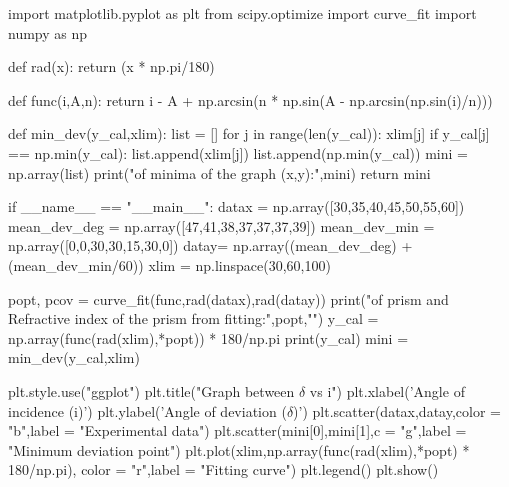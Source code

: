 \documentclass{article}
\begin{document}
\begin{pycode}


import matplotlib.pyplot as plt
from scipy.optimize import curve_fit
import numpy as np

def rad(x):
    return (x * np.pi/180)

def func(i,A,n):
    return i - A + np.arcsin(n * np.sin(A - np.arcsin(np.sin(i)/n)))

def min_dev(y_cal,xlim):
    list = []
    for j in range(len(y_cal)):
        xlim[j]
        if y_cal[j] == np.min(y_cal):
            list.append(xlim[j])
            list.append(np.min(y_cal))
    mini = np.array(list)
    print("\nCoordinates of minima of the graph (x,y):\n",mini)
    return mini
    

if __name__ == "__main__":
    datax = np.array([30,35,40,45,50,55,60])
    mean_dev_deg = np.array([47,41,38,37,37,37,39])
    mean_dev_min = np.array([0,0,30,30,15,30,0])
    datay= np.array((mean_dev_deg) + (mean_dev_min/60))
    xlim = np.linspace(30,60,100)

    popt, pcov = curve_fit(func,rad(datax),rad(datay))
    print("\nAngle of prism and Refractive index of the prism from fitting:\n",popt,"\n")
    y_cal = np.array(func(rad(xlim),*popt)) * 180/np.pi
    print(y_cal)
    mini = min_dev(y_cal,xlim)
    
    plt.style.use("ggplot")
    plt.title("Graph between $\delta$ vs i")
    plt.xlabel('Angle of incidence (i)')
    plt.ylabel('Angle of deviation ($\delta$)')
    plt.scatter(datax,datay,color = "b",label = "Experimental data")
    plt.scatter(mini[0],mini[1],c = "g",label = "Minimum deviation point")
    plt.plot(xlim,np.array(func(rad(xlim),*popt) * 180/np.pi), color = "r",label = "Fitting curve")
    plt.legend()
    plt.show()
\end{pycode}
\end{document}
